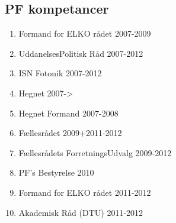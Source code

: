 \subsection{PF kompetancer}
\begin{enumerate}
\item Formand for ELKO rådet 2007-2009
\item UddanelsesPolitisk Råd 2007-2012
\item ISN Fotonik 2007-2012
\item Hegnet 2007->
\item Hegnet Formand 2007-2008
\item Fællesrådet 2009+2011-2012
\item Fællesrådets ForretningsUdvalg 2009-2012
\item PF's Bestyrelse 2010
\item Formand for ELKO rådet 2011-2012
\item Akademisk Råd (DTU) 2011-2012
\end{enumerate}

